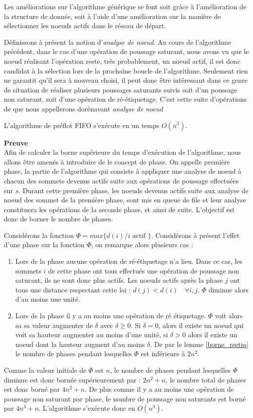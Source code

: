 Les améliorations sur l'algorithme générique se font soit grâce à l'amélioration de la structure de
donnée, soit à l'aide d'une amélioration sur la manière de sélectionner les noeuds actifs dans le
réseau de départ.

Définissons à présent la notion d'\emph{analyse de noeud}. Au cours de l'algorithme précédent, dans
le cas d'une opération de poussage saturant, nous avons vu que le noeud réalisant l'opération reste,
très probablement, un noeud actif, il est donc candidat à la sélection lors de la prochaine boucle
de l'algorithme. Seulement rien ne garantit qu'il sera à nouveau choisi, il peut donc être
intéressant dans ce genre de situation de réaliser plusieurs poussages saturants suivis soit d'un
poussage non saturant, soit d'une opération de ré-étiquetage. C'est cette suite d'opérations de que
nous appellerons dorénavant \emph{analyse de noeud}

\begin{thrm}
	L'algorithme de préflot FIFO s'exécute en un temps $O(n^3)$.
\end{thrm}

\textbf{Preuve} \\
Afin de calculer la borne supérieure du temps d'exécution de l'algorithme, nous allons être	amenés à
introduire de le concept de phase. On appelle première phase, la partie de l'algorithme qui consiste
à appliquer une analyse de noeud à chacun des sommets devenus actifs suite aux opérations de
poussage effectuées sur $s$. Durant cette première phase, les noeuds devenus actifs suite aux
analyse de noeud des sommet de la première phase, sont mis en queue de file et leur analyse
constituera les opérations de la seconde phase, et ainsi de suite. L'objectif est donc de borner le
nombre de phases.

Considérons la fonction $\Phi = max \{d(i) / i \mbox{ actif }\}$. Considérons à présent l'effet
d'une phase sur la fonction $\Phi$, on remarque alors plusieurs cas :
\begin{enumerate}
	\item Lors de la phase aucune opération de ré-étiquetage n'a lieu. Dans ce cas, les sommets $i$ de
		cette phase ont tous effectués une opération de poussage non saturant, ils ne sont donc plus
		actifs. Les noeuds actifs après la phase $j$ ont tous une distance respectant cette loi : $d(j)
		< d(i) \quad \forall i, j$. $\Phi$ diminue alors d'au moins une unité.
	\item Lors de la phase il y a au moins une opération de ré étiquetage. $\Phi$ voit alors sa sa
		valeur augmenter de $\delta$ avec $\delta \geq 0$. Si $\delta = 0$, alors il existe un noeud qui
		voit sa hauteur augmenter au moins d'une unité, si $\delta > 0$ alors il existe un noeud dont la
		hauteur augment d'au moins $\delta$. De par le lemme \ref{borne_reetiq} le nombre de phases
		pendant lesquelles $\Phi$ est inférieure à $2n^2$.
\end{enumerate}
Comme la valeur initiale de $\Phi$ est $n$, le nombre de phases pendant lesquelles $\Phi$ diminue
est donc bornée supérieurement par : $2n^2 + n$, le nombre total de phases est donc borné par $4n^2
+ n$. De plus comme il y a au moins une opération de poussage non saturant par phase, le nombre de
poussage non saturants est borné par $4n^3 + n$. L'algorithme s'exécute donc en $O(n^3)$.
